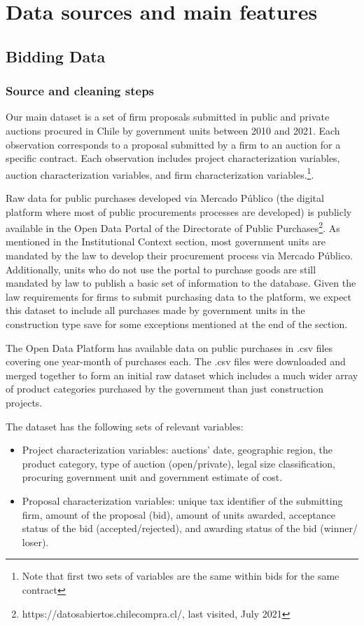 
\chapter{Data sources and main features}

\section{Bidding Data}
\subsection{Source and cleaning steps}
Our main dataset is a set of firm proposals submitted in public and private auctions procured in Chile by government units between 2010 and 2021. Each observation corresponds to a proposal submitted by a firm to an auction for a specific contract. Each observation includes project characterization variables, auction characterization variables, and firm characterization variables.\footnote{Note that first two sets of variables are the same within bids for the same contract}.

Raw data for public purchases developed via Mercado Público (the digital platform where most of public procurements processes are developed) is publicly available in the Open Data Portal of the Directorate of Public Purchases\footnote{https://datosabiertos.chilecompra.cl/, last visited, July 2021}. As mentioned in the Institutional Context section, most government units are mandated by the law to develop their procurement process via Mercado Público. Additionally, units who do not use the portal to purchase goods are still mandated by law to publish a basic set of information to the database. Given the law requirements for firms to submit purchasing data to the platform, we expect this dataset to include all purchases made by government units in the construction type save for some exceptions mentioned at the end of the section.

The Open Data Platform has available data on public purchases in .csv files covering one year-month of purchases each. The .csv files were downloaded and merged together to form an initial raw dataset which includes a much wider array of product categories purchased by the government than just construction projects.

The dataset has the following sets of relevant variables:
\begin{itemize}[itemsep=0.5pt]
  \item Project characterization variables: auctions’ date, geographic region, the product category, type of auction (open/private), legal size classification, procuring government unit and government estimate of cost.
  \item Proposal characterization variables: unique tax identifier of the submitting firm, amount of the proposal (bid), amount of units awarded, acceptance status of the bid (accepted/rejected), and awarding status of the bid (winner/ loser).
\end{itemize}


